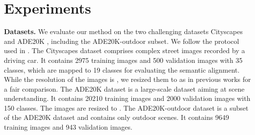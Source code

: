 \documentclass{bmvc2k}
\begin{document}
\section{Experiments}
\label{sec:exp}


\textbf{Datasets.} We evaluate our method on the two challenging datasets Cityscapes \cite{cordts2016cityscapes}
and ADE20K \cite{zhou2017scene}, including the ADE20K-outdoor subset. We follow the protocol used in \cite{park2019semantic,schonfeld_sushko_iclr2021}. The Cityscapes dataset comprises complex street images recorded by a driving car. It contains 2975 training images and 500 validation images with 35 classes, which are mapped to 19 classes for evaluating the semantic alignment. While the resolution of the images is , we resized them to  as in previous works for a fair comparison. The ADE20K dataset is a large-scale dataset aiming at scene understanding. It contains 20210 training images and 2000 validation images with 150 classes. The images are resized to . The ADE20K-outdoor dataset is a subset of the ADE20K dataset and contains only outdoor scenes. It contains 9649 training images and 943 validation images.
\end{document}
